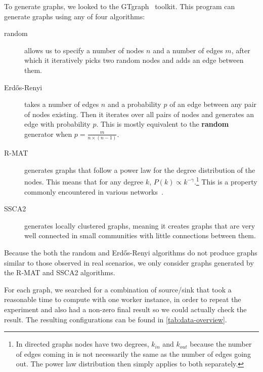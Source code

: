 To generate graphs, we looked to the GTgraph~\cite{bader2006gtgraph} toolkit. This program can generate graphs using any of four algorithms:
\begin{description}
    \item[random] allows us to specify a number of nodes $n$ and a number of edges $m$, after which it iteratively picks two random nodes and adds an edge between them.

    \item[Erd\H{o}s-Renyi] takes a number of edges $n$ and a probability $p$ of an edge between any pair of nodes existing. Then it iterates over all pairs of nodes and generates an edge with probability $p$. This is mostly equivalent to the \textbf{random} generator when $p = \frac{m}{n \times (n - 1)}$.

    \item[R-MAT] generates graphs that follow a power law for the degree distribution of the nodes. This means that for any degree $k$, $P(k) \propto k^{-\gamma}$.\footnote{In directed graphs nodes have two degrees, $k_{in}$ and $k_{out}$ because the number of edges coming in is not necessarily the same as the number of edges going out. The power law distribution then simply applies to both separately.} This is a property commonly encountered in various networks~\cite{newman2005power}.

    \item[SSCA2] generates locally clustered graphs, meaning it creates graphs that are very well connected in small communities with little connections between them.
\end{description}

Because the both the random and Erd\H{o}s-Renyi algorithms do not produce graphs similar to those observed in real scenarios, we only consider graphs generated by the R-MAT and SSCA2 algorithms.

For each graph, we searched for a combination of source/sink that took a reasonable time to compute with one worker instance, in order to repeat the experiment and also had a non-zero final result so we could actually check the result. The resulting configurations can be found in \autoref{tab:data-overview}.

